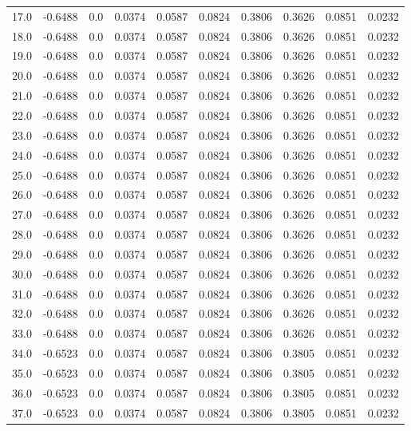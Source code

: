\begin{longtable}{lrrrrrrrrr}
17.0 & -0.6488 & 0.0 & 0.0374 & 0.0587 & 0.0824 & 0.3806 & 0.3626 & 0.0851 & 0.0232 \\
18.0 & -0.6488 & 0.0 & 0.0374 & 0.0587 & 0.0824 & 0.3806 & 0.3626 & 0.0851 & 0.0232 \\
19.0 & -0.6488 & 0.0 & 0.0374 & 0.0587 & 0.0824 & 0.3806 & 0.3626 & 0.0851 & 0.0232 \\
20.0 & -0.6488 & 0.0 & 0.0374 & 0.0587 & 0.0824 & 0.3806 & 0.3626 & 0.0851 & 0.0232 \\
21.0 & -0.6488 & 0.0 & 0.0374 & 0.0587 & 0.0824 & 0.3806 & 0.3626 & 0.0851 & 0.0232 \\
22.0 & -0.6488 & 0.0 & 0.0374 & 0.0587 & 0.0824 & 0.3806 & 0.3626 & 0.0851 & 0.0232 \\
23.0 & -0.6488 & 0.0 & 0.0374 & 0.0587 & 0.0824 & 0.3806 & 0.3626 & 0.0851 & 0.0232 \\
24.0 & -0.6488 & 0.0 & 0.0374 & 0.0587 & 0.0824 & 0.3806 & 0.3626 & 0.0851 & 0.0232 \\
25.0 & -0.6488 & 0.0 & 0.0374 & 0.0587 & 0.0824 & 0.3806 & 0.3626 & 0.0851 & 0.0232 \\
26.0 & -0.6488 & 0.0 & 0.0374 & 0.0587 & 0.0824 & 0.3806 & 0.3626 & 0.0851 & 0.0232 \\
27.0 & -0.6488 & 0.0 & 0.0374 & 0.0587 & 0.0824 & 0.3806 & 0.3626 & 0.0851 & 0.0232 \\
28.0 & -0.6488 & 0.0 & 0.0374 & 0.0587 & 0.0824 & 0.3806 & 0.3626 & 0.0851 & 0.0232 \\
29.0 & -0.6488 & 0.0 & 0.0374 & 0.0587 & 0.0824 & 0.3806 & 0.3626 & 0.0851 & 0.0232 \\
30.0 & -0.6488 & 0.0 & 0.0374 & 0.0587 & 0.0824 & 0.3806 & 0.3626 & 0.0851 & 0.0232 \\
31.0 & -0.6488 & 0.0 & 0.0374 & 0.0587 & 0.0824 & 0.3806 & 0.3626 & 0.0851 & 0.0232 \\
32.0 & -0.6488 & 0.0 & 0.0374 & 0.0587 & 0.0824 & 0.3806 & 0.3626 & 0.0851 & 0.0232 \\
33.0 & -0.6488 & 0.0 & 0.0374 & 0.0587 & 0.0824 & 0.3806 & 0.3626 & 0.0851 & 0.0232 \\
34.0 & -0.6523 & 0.0 & 0.0374 & 0.0587 & 0.0824 & 0.3806 & 0.3805 & 0.0851 & 0.0232 \\
35.0 & -0.6523 & 0.0 & 0.0374 & 0.0587 & 0.0824 & 0.3806 & 0.3805 & 0.0851 & 0.0232 \\
36.0 & -0.6523 & 0.0 & 0.0374 & 0.0587 & 0.0824 & 0.3806 & 0.3805 & 0.0851 & 0.0232 \\
37.0 & -0.6523 & 0.0 & 0.0374 & 0.0587 & 0.0824 & 0.3806 & 0.3805 & 0.0851 & 0.0232 \\

\end{longtable}
